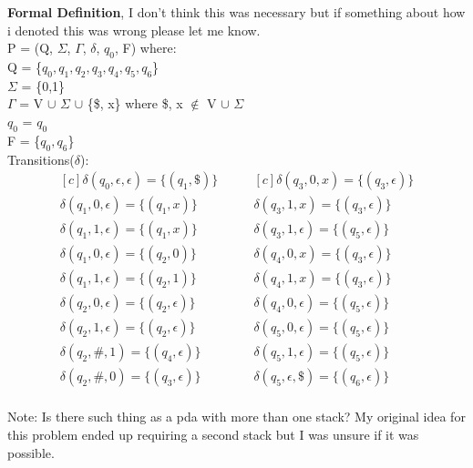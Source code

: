 \documentclass[12pt]{report}
\begin{document}
\pagebreak

\textbf{Formal Definition}, I don't think this was necessary but if something about how i denoted this was wrong please let me know.\\

P = (Q, $\Sigma$, $\Gamma$, $\delta$, $q_0$, F) where: \\
\tab Q = \{$q_0, q_1, q_2, q_3, q_4, q_5, q_6$\}\\
\tab $\Sigma$ = \{0,1\}\\
\tab $\Gamma$ = V $\cup$ $\Sigma$ $\cup$ \{\$, x\} where \$, x $\notin$ V $\cup$ $\Sigma$ \\
\tab $q_0$ = $q_0$\\
\tab F = \{$q_0, q_6$\}\\
\tab Transitions($\delta$): \\
\begin{equation*}
	\begin{aligned}[c]
		\delta(q_0, \epsilon, \epsilon) = \{(q_1,  \$)\} \\
		\delta(q_1, 0, \epsilon) = \{(q_1,  x)\}         \\
		\delta(q_1, 1, \epsilon) = \{(q_1,  x)\}         \\
		\delta(q_1, 0, \epsilon) = \{(q_2,  0)\}         \\
		\delta(q_1, 1, \epsilon) = \{(q_2,  1)\}         \\
		\delta(q_2, 0, \epsilon) = \{(q_2,  \epsilon)\}  \\
		\delta(q_2, 1, \epsilon) = \{(q_2,  \epsilon)\}  \\
		\delta(q_2, \#, 1) = \{(q_4,  \epsilon)\}        \\
		\delta(q_2, \#, 0) = \{(q_3,  \epsilon)\}        \\
	\end{aligned}
	\quad\quad
	\begin{aligned}[c]
		\delta(q_3, 0, x) = \{(q_3,  \epsilon)\}         \\
		\delta(q_3, 1, x) = \{(q_3,  \epsilon)\}         \\
		\delta(q_3, 1, \epsilon) = \{(q_5,  \epsilon)\}  \\
		\delta(q_4, 0, x) = \{(q_3,  \epsilon)\}         \\
		\delta(q_4, 1, x) = \{(q_3,  \epsilon)\}         \\
		\delta(q_4, 0, \epsilon) = \{(q_5,  \epsilon)\}  \\
		\delta(q_5, 0, \epsilon) = \{(q_5,  \epsilon)\}  \\
		\delta(q_5, 1, \epsilon) = \{(q_5,  \epsilon)\}  \\
		\delta(q_5, \epsilon, \$) = \{(q_6,  \epsilon)\} \\
	\end{aligned}
\end{equation*}


Note: Is there such thing as a pda with more than one stack? My original idea for this problem ended up requiring a second stack but I was unsure if it was possible.\\
\end{document}

